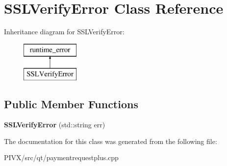 \hypertarget{class_s_s_l_verify_error}{}\section{S\+S\+L\+Verify\+Error Class Reference}
\label{class_s_s_l_verify_error}
Inheritance diagram for S\+S\+L\+Verify\+Error\+:\begin{figure}[H]
\begin{center}
\leavevmode
\includegraphics[height=2.000000cm]{class_s_s_l_verify_error}
\end{center}
\end{figure}
\subsection*{Public Member Functions}
\begin{DoxyCompactItemize}
\item 
\mbox{\label{class_s_s_l_verify_error_a3183bdade1e32616a651654ed921baba}} 
{\bfseries S\+S\+L\+Verify\+Error} (std\+::string err)
\end{DoxyCompactItemize}


The documentation for this class was generated from the following file\+:\begin{DoxyCompactItemize}
\item 
P\+I\+V\+X/src/qt/paymentrequestplus.\+cpp\end{DoxyCompactItemize}
